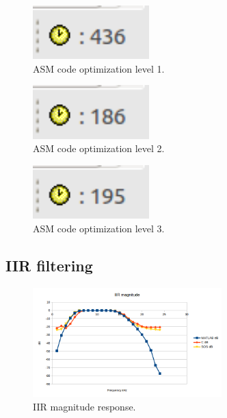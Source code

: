 \documentclass{article}
\begin{document}
\begin{figure}[h!]
  \begin{center}
    \includegraphics[width=0.4\textwidth]{img/asm_opt_1.png}
    \caption{ASM code optimization level 1.}
  \end{center}
\end{figure}

\begin{figure}[h!]
  \begin{center}
    \includegraphics[width=0.4\textwidth]{img/asm_opt_2.png}
    \caption{ASM code optimization level 2.}
  \end{center}
\end{figure}

\begin{figure}[h!]
  \begin{center}
    \includegraphics[width=0.4\textwidth]{img/asm_opt_3.png}
    \caption{ASM code optimization level 3.}
  \end{center}
\end{figure}

\clearpage
\subsection{IIR filtering}

\begin{figure}[h]
  \begin{center}
    \includegraphics[width=0.65\textwidth]{img/iir_mag.png}
    \caption{IIR magnitude response.}
  \end{center}
\end{figure}
\end{document}
